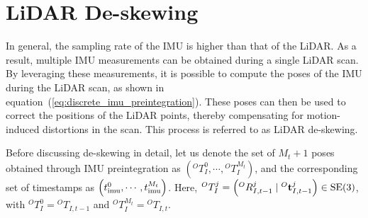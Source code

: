 \section{LiDAR De-skewing}
\label{subsec:deskew_scan_distortion}

In general, the sampling rate of the IMU is higher than that of the LiDAR.
As a result, multiple IMU measurements can be obtained during a single LiDAR scan.
By leveraging these measurements, it is possible to compute the poses of the IMU during the LiDAR scan, as shown in equation~(\ref{eq:discrete_imu_preintegration}).
These poses can then be used to correct the positions of the LiDAR points, thereby compensating for motion-induced distortions in the scan.
This process is referred to as LiDAR de-skewing.

Before discussing de-skewing in detail, let us denote the set of $M_{t}+1$ poses obtained through IMU preintegration as $\left( {}^{O}T_{I}^{0}, \cdots, {}^{O}T_{I}^{M_{t}} \right)$, and the corresponding set of timestamps as $\left( t_{\rm imu}^{0}, \cdots, t_{\rm imu}^{M_{t}} \right)$.
Here, ${}^{O}T_{I}^{j} = \left( {}^{O}R_{I, t-1}^{j} \mid {}^{O}{\bf t}_{I, t-1}^{j} \right) \in {\rm SE}(3)$, with ${}^{O}T_{I}^{0} = {}^{O}T_{I, t-1}$ and ${}^{O}T_{I}^{M_{t}} = {}^{O}T_{I, t}$.

